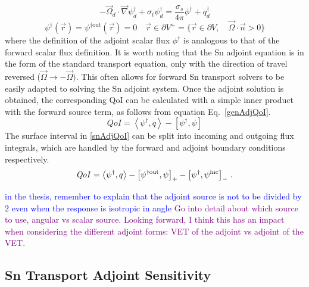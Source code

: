 \documentclass[12pt]{report}
\newcommand{\vr}{\vec{r}}
\newcommand{\vO}{\vec{\Omega}}
\newcommand{\bra}{\left\langle}
\newcommand{\ket}{\right\rangle}
\newcommand{\sbra}{\left[}
\newcommand{\sket}{\right]}
\newcommand{\grad}{\vec{\nabla}}
\newcommand{\bound}{\partial V}
\newcommand{\sigt}{\sigma_t}
\newcommand{\sigs}{\sigma_s}
\newcommand{\angSource}{q}
\newcommand{\angResp}{q^\dag}
\newcommand{\qoi}{{\it QoI}\xspace}
\newcommand{\comment}[2]{\marginpar{\textcolor{#2}{$\star$}}\textcolor{#2}{#1}\newline}
\newcommand{\jcr}[1]{\comment{#1}{blue}}
\newcommand{\todo}[1]{\comment{#1}{purple}}
\newcommand{\jcr}[1]{\phantom{a}}
\newcommand{\todo}[1]{\phantom{a}}
\begin{document}
\begin{equation}
\label{snAdj}
- \vO_d \cdot \grad \psi^\dag_d + \sigt \psi^\dag_d = \frac{\sigs}{4 \pi} \phi^\dag + \angResp_d
\end{equation}
%
\begin{equation}
\psi^\dag(\vr) = \psi^{\dag \text{out}}(\vr)=0 \quad \vr \in \partial V^{+} = \{  \vr \in \bound , \quad \vO \cdot \vec{n} > 0 \}
\end{equation}
where the definition of the adjoint scalar flux $\phi^\dag$ is analogous to that of 
the forward scalar flux definition. It is worth noting that the Sn adjoint equation is in the form of the standard transport equation, only with the direction of travel reversed ($\vO \to -\vO)$. This often allows for forward Sn transport solvers to be easily adapted to solving the Sn adjoint system. Once the adjoint solution is obtained, the corresponding QoI can be calculated with a simple inner product with the forward source term, as follows from equation Eq.~\eqref{genAdjQoI}. %
\begin{equation}
\label{snAdjQoI}
QoI = \bra \psi^\dag , \angSource \ket - \sbra \psi^\dag,  \psi \sket
\end{equation}
%
The surface interval in \eqref{snAdjQoI} can be split into incoming and outgoing flux integrals, which are handled by the forward and adjoint boundary conditions respectively. 
%
\begin{equation}
\label{snAdjQoIBCsplit}
\qoi = \bra \psi^\dag , q \ket - \sbra \psi^{\dag \text{out}},  \psi \sket_+ - \sbra \psi^\dag,  \psi^{\text{inc}} \sket_- \,.
\end{equation}

\jcr{in the thesis, remember to explain that the adjoint source is not to be divided by 2 even when the response is isotropic in angle}
\todo{Go into detail about which source to use, angular vs scalar source. Looking forward, I think this has an impact when considering the different adjoint forms: VET of the adjoint vs adjoint of the VET.}
\subsection{Sn Transport Adjoint Sensitivity}
\end{document}
